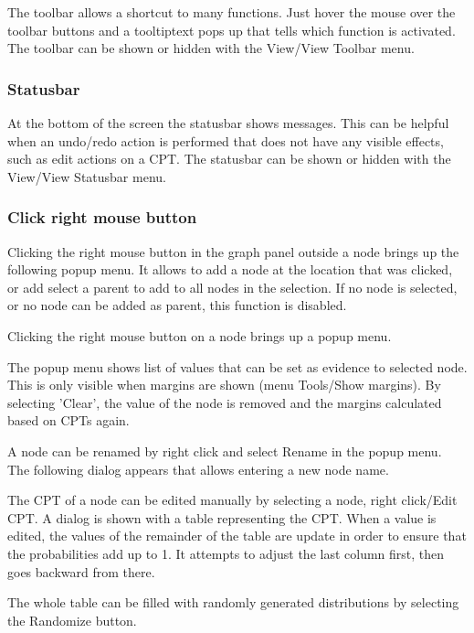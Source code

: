 \documentclass[a4paper]{article}
\begin{document}
The toolbar allows a shortcut to many functions. Just hover the mouse
over the toolbar buttons and a tooltiptext pops up that tells which 
function is activated. The toolbar can be shown or hidden with the View/View 
Toolbar menu.

\subsubsection*{Statusbar}

At the bottom of the screen the statusbar shows messages. This can be 
helpful when an undo/redo action is performed that does not have any
visible effects, such as edit actions on a CPT. The statusbar can be shown 
or hidden with the View/View Statusbar menu.

\subsubsection*{Click right mouse button}

Clicking the right mouse button in the graph panel outside a node
brings up the following popup menu. It allows to add a node
at the location that was clicked, or add select a parent to
add to all nodes in the selection. If no node is selected, or no node
can be added as parent, this function is disabled.
\begin{center}
\end{center}

Clicking the right mouse button on a node brings up a popup menu.

The popup menu shows list of values that can be set as evidence to selected node.
This is only visible when margins are shown (menu Tools/Show margins).
By selecting 'Clear', the value of the node is removed and the margins
calculated based on CPTs again.
\begin{center}
\end{center}
	
A node can be renamed by right click and select Rename in the popup menu.
The following dialog appears that allows entering a new node name.
\begin{center}
\end{center}



The CPT of a node can be edited manually by selecting a node,
right click/Edit CPT. A dialog is shown with a table representing the
CPT. When a value is edited, the values of the remainder of the table
are update in order to ensure that the probabilities add up to 1.
It attempts to adjust the last column first, then goes backward from there.
\begin{center}
\end{center}
The whole table can be filled with randomly generated distributions by
selecting the Randomize button.
\end{document}
